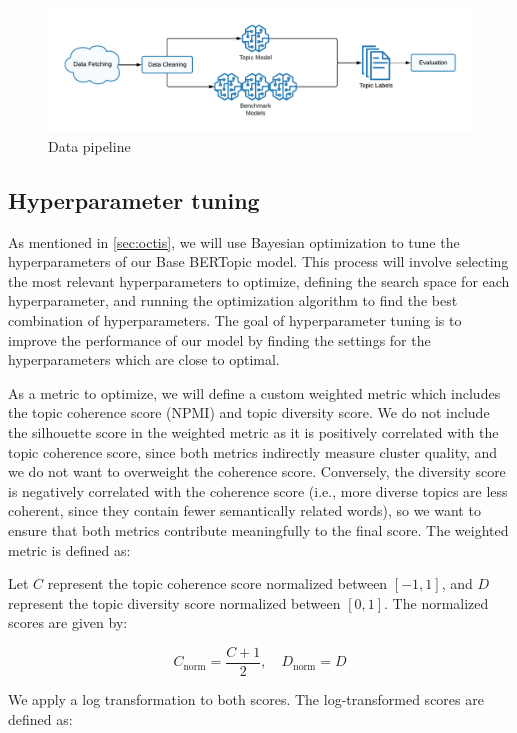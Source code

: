 \begin{figure}[h]
    \centering
    \includegraphics[width=\textwidth]{figures/data_pipeline.pdf}
    \caption{Data pipeline}
    \label{fig:data_pipeline}
\end{figure}

\subsection{Hyperparameter tuning}
\label{sec:hyperparameter_tuning}
As mentioned in \cref{sec:octis}, we will use Bayesian optimization to tune the hyperparameters of our Base BERTopic model. This process will involve selecting the most relevant hyperparameters to optimize, defining the search space for each hyperparameter, and running the optimization algorithm to find the best combination of hyperparameters. The goal of hyperparameter tuning is to improve the performance of our model by finding the settings for the hyperparameters which are close to optimal.

As a metric to optimize, we will define a custom weighted metric which includes the topic coherence score (NPMI) and topic diversity score. We do not include the silhouette score in the weighted metric as it is positively correlated with the topic coherence score, since both metrics indirectly measure cluster quality, and we do not want to overweight the coherence score. Conversely, the diversity score is negatively correlated with the coherence score (i.e., more diverse topics are less coherent, since they contain fewer semantically related words), so we want to ensure that both metrics contribute meaningfully to the final score. The weighted metric is defined as:

Let \( C \) represent the topic coherence score normalized between \([-1, 1]\), and \( D \) represent the topic diversity score normalized between \([0, 1]\). The normalized scores are given by:

\[
C_{\text{norm}} = \frac{C + 1}{2}, \quad D_{\text{norm}} = D
\]

We apply a log transformation to both scores. The log-transformed scores are defined as:


